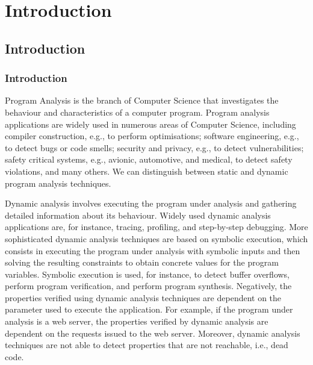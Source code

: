 \part{Introduction}
\chapter{Introduction}
\section{Introduction}

Program Analysis is the branch of Computer Science that investigates the behaviour
and characteristics of a computer program. Program analysis applications are widely
used in numerous areas of Computer Science, including compiler construction,
e.g., to perform optimisations; software engineering, e.g., to detect bugs or
code smells; security and privacy, e.g., to detect vulnerabilities; safety
critical systems, e.g., avionic, automotive, and medical, to detect safety
violations, and many others.
We can distinguish between static and dynamic program analysis techniques.

Dynamic analysis involves executing the program under analysis and gathering
detailed information about its behaviour. Widely used dynamic analysis applications
are, for instance, tracing, profiling, and step-by-step debugging. More sophisticated dynamic
analysis techniques are based on symbolic execution, which consists in executing
the program under analysis with symbolic inputs and then solving the resulting
constraints to obtain concrete values for the program variables. Symbolic execution
is used, for instance, to detect buffer overflows, perform program verification,
and perform program synthesis.
Negatively, the properties verified using dynamic analysis techniques 
are dependent on the parameter used to execute the application. For example, if the
program under analysis is a web server, the properties verified by dynamic analysis
are dependent on the requests issued to the web server. Moreover, dynamic analysis
techniques are not able to detect properties that are not reachable, i.e., dead code.


